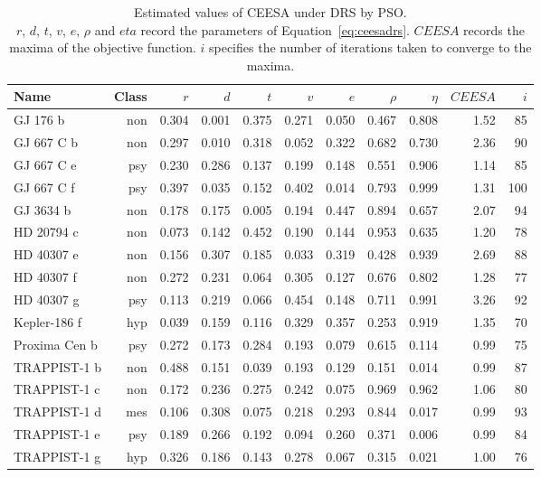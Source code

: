 \documentclass[10pt]{article}
\begin{document}
\begin{table}
  \centering
  \begin{tabular}{l r r r r r r r r r r}
    \toprule
    Name & Class & $r$ & $d$ & $t$ & $v$ & $e$ & $\rho$ & $\eta$ & $\mathit{CEESA}$ & $i$\\
    \midrule
    GJ 176 b & non & 0.304 & 0.001 & 0.375 & 0.271 & 0.050 & 0.467 & 0.808 & 1.52 &  85\\
    GJ 667 C b & non & 0.297 & 0.010 & 0.318 & 0.052 & 0.322 & 0.682 & 0.730 & 2.36 &  90\\
    GJ 667 C e & psy & 0.230 & 0.286 & 0.137 & 0.199 & 0.148 & 0.551 & 0.906 & 1.14 &  85\\
    GJ 667 C f & psy & 0.397 & 0.035 & 0.152 & 0.402 & 0.014 & 0.793 & 0.999 & 1.31 & 100\\
    GJ 3634 b & non & 0.178 & 0.175 & 0.005 & 0.194 & 0.447 & 0.894 & 0.657 & 2.07 &  94\\
    HD 20794 c & non & 0.073 & 0.142 & 0.452 & 0.190 & 0.144 & 0.953 & 0.635 & 1.20 &  78\\
    HD 40307 e & non & 0.156 & 0.307 & 0.185 & 0.033 & 0.319 & 0.428 & 0.939 & 2.69 &  88\\
    HD 40307 f & non & 0.272 & 0.231 & 0.064 & 0.305 & 0.127 & 0.676 & 0.802 & 1.28 &  77\\
    HD 40307 g & psy & 0.113 & 0.219 & 0.066 & 0.454 & 0.148 & 0.711 & 0.991 & 3.26 &  92\\
    Kepler-186 f & hyp & 0.039 & 0.159 & 0.116 & 0.329 & 0.357 & 0.253 & 0.919 & 1.35 &  70\\
    Proxima Cen b & psy & 0.272 & 0.173 & 0.284 & 0.193 & 0.079 & 0.615 & 0.114 & 0.99 &  75\\
    TRAPPIST-1 b & non & 0.488 & 0.151 & 0.039 & 0.193 & 0.129 & 0.151 & 0.014 & 0.99 &  87\\
    TRAPPIST-1 c & non & 0.172 & 0.236 & 0.275 & 0.242 & 0.075 & 0.969 & 0.962 & 1.06 &  80\\
    TRAPPIST-1 d & mes & 0.106 & 0.308 & 0.075 & 0.218 & 0.293 & 0.844 & 0.017 & 0.99 &  93\\
    TRAPPIST-1 e & psy & 0.189 & 0.266 & 0.192 & 0.094 & 0.260 & 0.371 & 0.006 & 0.99 &  84\\
    TRAPPIST-1 g & hyp & 0.326 & 0.186 & 0.143 & 0.278 & 0.067 & 0.315 & 0.021 & 1.00 &  76\\
    \bottomrule
  \end{tabular}
  \caption{Estimated values of CEESA under DRS by PSO.\\
    \footnotesize $r$, $d$, $t$, $v$, $e$, $\rho$ and $eta$ record the parameters of Equation~\ref{eq:ceesadrs}.
    $\mathit{CEESA}$ records the maxima of the objective function. $i$ specifies the number of iterations taken to
    converge to the maxima.
  }\label{tab:ceesadrs}
\end{table}
\end{document}
